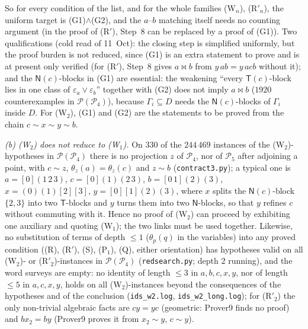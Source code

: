 \documentclass[11pt]{amsart}
\theoremstyle{definition}
\renewcommand{\P}{\mathcal{P}}
\newcommand{\T}{\mathsf{T}}
\newcommand{\N}{\mathsf{N}}
\newcommand{\mt}{\bowtie}   %
\begin{document}
So for every condition of the list, and for the whole families (W$_n$), (R$'_n$), the uniform target is (G1)$\wedge$(G2), and the $a$--$b$ matching itself needs no counting argument (in the proof of (R$'$), Step~8 can be replaced by a proof of (G1)). Two qualifications (cold read of 11~Oct): the closing step is simplified uniformly, but the proof burden is not reduced, since (G1) is an extra statement to prove and is at present only verified (for (R$'$), Step~8 gives $a\mt b$ from $y\,ab=y\,acb$ without it); and the $\N(c)$-blocks in (G1) are essential: the weakening ``every $\T(c)$-block lies in one class of $\varepsilon_a\vee\varepsilon_b$'' together with (G2) does not imply $a\mt b$ ($1920$ counterexamples in $\P(\P_4)$), because $\Gamma_i\subseteq D$ needs the $\N(c)$-blocks of $\Gamma_i$ inside $D$. For (W$_2$), (G1) and (G2) are the statements to be proved from the chain $c\sim x\sim y\sim b$.

\emph{(b) (W$_2$) does not reduce to (W$_1$).} On $330$ of the $244\,469$ instances of the (W$_2$)-hypotheses in $\P(\P_4)$ there is no projection $z$ of $\P_4$, nor of $\P_5$ after adjoining a point, with $c\sim z$, $\theta_z(a)=\theta_z(c)$ and $z\sim b$ (\texttt{contract3.py}); a typical one is $a=[0](1\,2\,3)$, $c=[0](1)(2\,3)$, $b=[0\,1](2)(3)$, $x=(0)(1)[2][3]$, $y=[0][1](2)(3)$, where $x$ splits the $\N(c)$-block $\{2,3\}$ into two $\T$-blocks and $y$ turns them into two $\N$-blocks, so that $y$ refines $c$ without commuting with it. Hence no proof of (W$_2$) can proceed by exhibiting one auxiliary and quoting (W$_1$); the two links must be used together. Likewise, no substitution of terms of depth $\le1$ ($\theta_p(q)$ in the variables) into any proved condition ((R), (R$'$), (S), (P$_1$), (Q), either orientation) has hypotheses valid on all (W$_2$)- or (R$'_2$)-instances in $\P(\P_4)$ (\texttt{redsearch.py}; depth $2$ running), and the word surveys are empty: no identity of length $\le3$ in $a,b,c,x,y$, nor of length $\le5$ in $a,c,x,y$, holds on all (W$_2$)-instances beyond the consequences of the hypotheses and of the conclusion (\texttt{ids\_w2.log}, \texttt{ids\_w2\_long.log}); for (R$'_2$) the only non-trivial algebraic facts are $cy=yc$ (geometric: Prover9 finds no proof) and $bx_2=by$ (Prover9 proves it from $x_2\sim y$, $c\sim y$).
\end{document}
